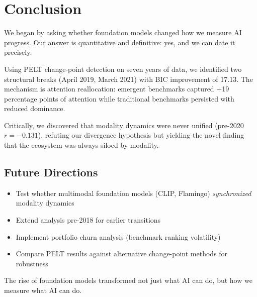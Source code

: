 \section{Conclusion}
\label{sec:conclusion}

We began by asking whether foundation models changed how we measure AI progress. Our answer is quantitative and definitive: yes, and we can date it precisely.

Using PELT change-point detection on seven years of data, we identified two structural breaks (April 2019, March 2021) with BIC improvement of 17.13. The mechanism is attention reallocation: emergent benchmarks captured +19 percentage points of attention while traditional benchmarks persisted with reduced dominance.

Critically, we discovered that modality dynamics were never unified (pre-2020 $r = -0.131$), refuting our divergence hypothesis but yielding the novel finding that the ecosystem was always siloed by modality.

\subsection{Future Directions}

\begin{itemize}
    \item Test whether multimodal foundation models (CLIP, Flamingo) \emph{synchronized} modality dynamics
    \item Extend analysis pre-2018 for earlier transitions
    \item Implement portfolio churn analysis (benchmark ranking volatility)
    \item Compare PELT results against alternative change-point methods for robustness
\end{itemize}

The rise of foundation models transformed not just what AI can do, but how we measure what AI can do.
